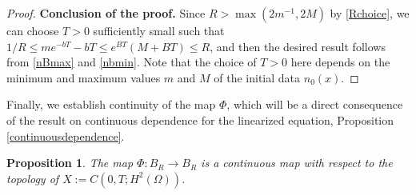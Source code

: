 \documentclass[12pt]{article}
\theoremstyle{plain}
\newtheorem{proposition}{Proposition}[section]
\begin{document}
\begin{proof}
\medskip

\noindent \textbf{Conclusion of the proof.} Since $R > \max(2m^{-1}, 2M)$ by \eqref{Rchoice}, we can choose $T > 0$ sufficiently small such that $1/R \le me^{-bT} - bT \le e^{BT}(M + BT) \le R$, and then the desired result follows from \eqref{nBmax} and \eqref{nbmin}. Note that the choice of $T > 0$ here depends on the minimum and maximum values $m$ and $M$ of the initial data $n_{0}(x)$.

\end{proof}

Finally, we establish continuity of the map $\Phi$, which will be a direct consequence of the result on continuous dependence for the linearized equation, Proposition \ref{continuousdependence}.

\begin{proposition}
The map $\Phi: B_{R} \to B_{R}$ is a continuous map with respect to the topology of $X := C(0, T; H^{2}(\Omega))$.
\end{proposition}
\end{document}
